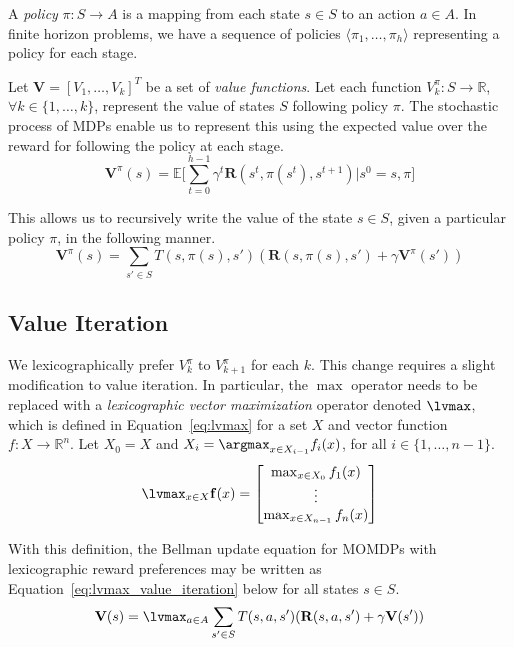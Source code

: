 A \emph{policy} $\pi : S \rightarrow A$ is a mapping from each state $s \in S$ to an action $a \in A$. In finite horizon problems, we have a sequence of policies $\langle \pi_1, \ldots, \pi_h \rangle$ representing a policy for each stage.

Let $\mathbf{V} = [V_1, \ldots, V_k]^T$ be a set of \emph{value functions}. Let each function $V_k^\pi : S \rightarrow \mathbb{R}$, $\forall k \in \{1, \ldots, k\}$, represent the value of states $S$ following policy $\pi$. The stochastic process of MDPs enable us to represent this using the expected value over the reward for following the policy at each stage.
\begin{equation*}
    \mathbf{V}^\pi(s) = \mathbb{E} \Big[ \sum_{t=0}^{h-1} \gamma^t \mathbf{R}(s^t, \pi(s^t), s^{t+1}) \Big| s^0 = s, \pi \Big]
\end{equation*}

This allows us to recursively write the value of the state $s \in S$, given a particular policy $\pi$, in the following manner.
\begin{equation*}
    \mathbf{V}^\pi(s) = \sum_{s' \in S} T(s, \pi(s), s') (\mathbf{R}(s, \pi(s), s') + \gamma \mathbf{V}^\pi(s'))
\end{equation*}


\subsection{Value Iteration}

We lexicographically prefer $V_k^\pi$ to $V_{k+1}^\pi$ for each $k$. This change requires a slight modification to value iteration. In particular, the $\max$ operator needs to be replaced with a \emph{lexicographic vector maximization} operator denoted $\lvmax$, which is defined in Equation~\ref{eq:lvmax} for a set $X$ and vector function $f : X \rightarrow \mathbb{R}^n$. Let $X_0 = X$ and $X_i = \argmax_{x \in X_{i-1}} f_i(x)$, for all $i \in \{1, \ldots, n-1\}$.
\begin{equation}
    \label{eq:lvmax}
    \lvmax_{x \in X} \mathbf{f}(x) = \begin{bmatrix}
            \max_{x \in X_0} f_1(x) \\
            \vdots \\
            \max_{x \in X_{n-1}} f_n(x)
        \end{bmatrix}
\end{equation}

With this definition, the Bellman update equation for MOMDPs with lexicographic reward preferences may be written as Equation~\ref{eq:lvmax_value_iteration} below for all states $s \in S$.
\begin{equation}
    \label{eq:lvmax_value_iteration}
    \mathbf{V}(s) = \lvmax_{a \in A} \sum_{s' \in S} T(s, a, s') (\mathbf{R}(s, a, s') + \gamma \mathbf{V}(s'))
\end{equation}

